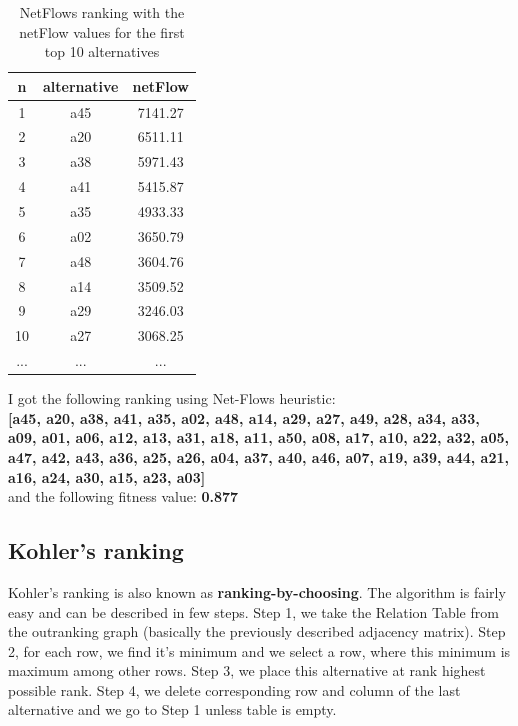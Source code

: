 \documentclass[a4paper]{article}
\begin{document}
\begin{table}[H]
	\centering
	\begin{tabular}{|c|c|c|}
		\hline
		n                   & alternative & netFlow \\ \hline
		1 & a45 & 7141.27 \\ \hline
		2 & a20 & 6511.11 \\ \hline
		3 & a38 & 5971.43 \\ \hline
		4 & a41 & 5415.87 \\ \hline
		5 & a35 & 4933.33 \\ \hline
		6 & a02 & 3650.79 \\ \hline
		7 & a48 & 3604.76 \\ \hline
		8 & a14 & 3509.52 \\ \hline
		9 & a29 & 3246.03 \\ \hline
		10 & a27 & 3068.25 \\ \hline
		... & ... & ... \\ \hline
	\end{tabular}
	\caption{NetFlows ranking with the netFlow values for the first top 10 alternatives}
	\label{fig:netflows2}
\end{table}

I got the following ranking using Net-Flows heuristic:\\

\textbf{[a45, a20, a38, a41, a35, a02, a48, a14, a29, a27, a49, a28, a34, a33, a09, a01, a06, a12, a13, a31, a18, a11, a50, a08, a17, a10, a22, a32, a05, a47, a42, a43, a36, a25, a26, a04, a37, a40, a46, a07, a19, a39, a44, a21, a16, a24, a30, a15, a23, a03]}\\

and the following fitness value: \textbf{0.877}

\subsection{Kohler's ranking}

Kohler's ranking is also known as \textbf{ranking-by-choosing}. The algorithm is fairly easy and can be described in few steps. Step 1, we take the Relation Table from the outranking graph (basically the previously described adjacency matrix). Step 2, for each row, we find it's minimum and we select a row, where this minimum is maximum among other rows. Step 3, we place this alternative at rank highest possible rank. Step 4, we delete corresponding row and column of the last alternative and we go to Step 1 unless table is empty.
\end{document}
